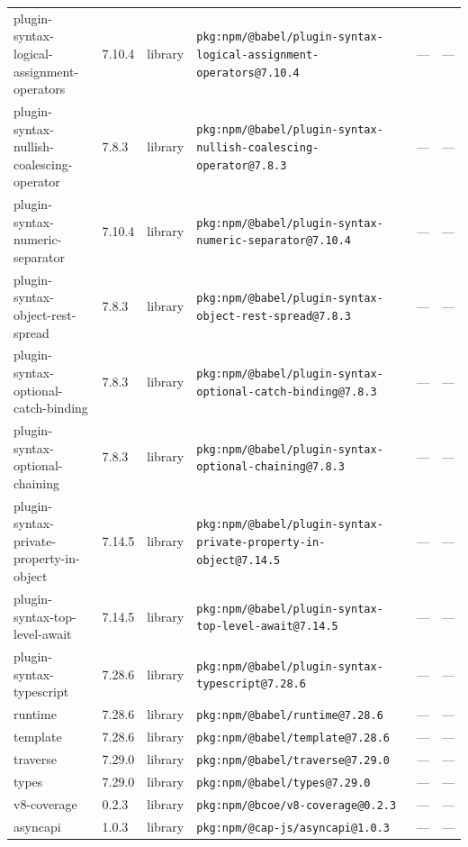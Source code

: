 \documentclass[11pt,a4paper]{article}
\begin{document}
\begin{longtable}{|p{4cm}|p{2cm}|p{1.6cm}|p{5cm}|p{1.5cm}|p{3.5cm}|}
\raggedright plugin-syntax-logical-assignment-operators & 7.10.4 & library & \small\texttt{pkg:npm/@babel/plugin-syntax-logical-assignment-operators@7.10.4} & — & \small — \\
\raggedright plugin-syntax-nullish-coalescing-operator & 7.8.3 & library & \small\texttt{pkg:npm/@babel/plugin-syntax-nullish-coalescing-operator@7.8.3} & — & \small — \\
\raggedright plugin-syntax-numeric-separator & 7.10.4 & library & \small\texttt{pkg:npm/@babel/plugin-syntax-numeric-separator@7.10.4} & — & \small — \\
\raggedright plugin-syntax-object-rest-spread & 7.8.3 & library & \small\texttt{pkg:npm/@babel/plugin-syntax-object-rest-spread@7.8.3} & — & \small — \\
\raggedright plugin-syntax-optional-catch-binding & 7.8.3 & library & \small\texttt{pkg:npm/@babel/plugin-syntax-optional-catch-binding@7.8.3} & — & \small — \\
\raggedright plugin-syntax-optional-chaining & 7.8.3 & library & \small\texttt{pkg:npm/@babel/plugin-syntax-optional-chaining@7.8.3} & — & \small — \\
\raggedright plugin-syntax-private-property-in-object & 7.14.5 & library & \small\texttt{pkg:npm/@babel/plugin-syntax-private-property-in-object@7.14.5} & — & \small — \\
\raggedright plugin-syntax-top-level-await & 7.14.5 & library & \small\texttt{pkg:npm/@babel/plugin-syntax-top-level-await@7.14.5} & — & \small — \\
\raggedright plugin-syntax-typescript & 7.28.6 & library & \small\texttt{pkg:npm/@babel/plugin-syntax-typescript@7.28.6} & — & \small — \\
\raggedright runtime & 7.28.6 & library & \small\texttt{pkg:npm/@babel/runtime@7.28.6} & — & \small — \\
\raggedright template & 7.28.6 & library & \small\texttt{pkg:npm/@babel/template@7.28.6} & — & \small — \\
\raggedright traverse & 7.29.0 & library & \small\texttt{pkg:npm/@babel/traverse@7.29.0} & — & \small — \\
\raggedright types & 7.29.0 & library & \small\texttt{pkg:npm/@babel/types@7.29.0} & — & \small — \\
\raggedright v8-coverage & 0.2.3 & library & \small\texttt{pkg:npm/@bcoe/v8-coverage@0.2.3} & — & \small — \\
\raggedright asyncapi & 1.0.3 & library & \small\texttt{pkg:npm/@cap-js/asyncapi@1.0.3} & — & \small — \\

\end{longtable}
\end{document}
